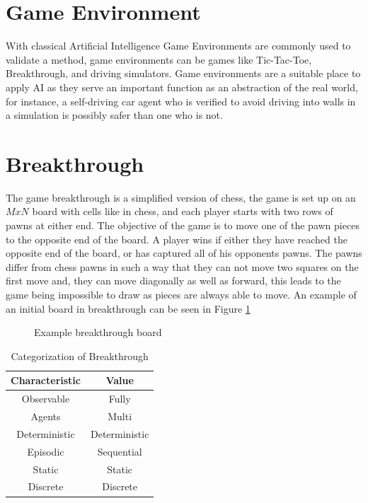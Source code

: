 \section{Game Environment}

With classical Artificial Intelligence Game Environments are commonly used to validate a method, 
game environments can be games like Tic-Tac-Toe, Breakthrough, and driving simulators. Game environments 
are a suitable place to apply AI as they serve an important function as an abstraction of the real 
world, for instance, a self-driving car agent who is verified to avoid driving into walls in a 
simulation is possibly safer than one who is not.

\section{Breakthrough}

The game breakthrough is a simplified version of chess, the game is set up on an $MxN$ board with 
cells like in chess, and each player starts with two rows of pawns at either end. The objective of the 
game is to move one of the pawn pieces to the opposite end of the board. A player wins if 
either they have reached the opposite end of the board, or has captured all of his opponents pawns.
The pawns differ from chess pawns in such a way that they can not move two squares on the first move and,
they can move diagonally as well as forward, this leads to the game being impossible to draw as 
pieces are always able to move. An example of an initial board in breakthrough can be seen in Figure \ref{fig:initbtboard}

\begin{figure}[]
  \centering

  
  \caption{Example breakthrough board}
  \label{fig:initbtboard}
\end{figure}


\begin{table}[h]
  \centering
  \begin{tabular}{|c|c|}\hline
    \textbf{Characteristic} & \textbf{Value}\\\hline
    Observable & Fully \\
    Agents & Multi \\
    Deterministic & Deterministic\\
    Episodic & Sequential \\
    Static & Static \\
    Discrete & Discrete \\\hline
  \end{tabular}
  \caption{Categorization of Breakthrough}
  \label{tab:breakthrough_cat}
\end{table}

